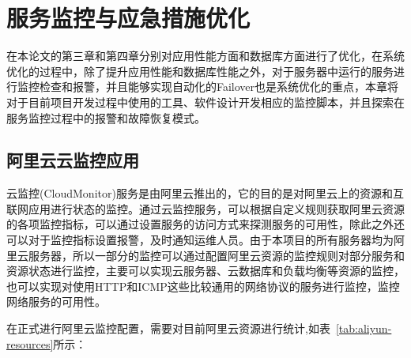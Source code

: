 \chapter{服务监控与应急措施优化}
在本论文的第三章和第四章分别对应用性能方面和数据库方面进行了优化，在系统优化的过程中，除了提升应用性能和数据库性能之外，对于服务器中运行的服务进行监控检查和报警，并且能够实现自动化的Failover也是系统优化的重点，本章将对于目前项目开发过程中使用的工具、软件设计开发相应的监控脚本，并且探索在服务监控过程中的报警和故障恢复模式\cite{刘雄辉2007服务器监控管理}。
\label{cha:Monitor}
\section{阿里云云监控应用}
云监控(CloudMonitor)服务是由阿里云推出的，它的目的是对阿里云上的资源和互联网应用进行状态的监控。通过云监控服务，可以根据自定义规则获取阿里云资源的各项监控指标，可以通过设置服务的访问方式来探测服务的可用性，除此之外还可以对于监控指标设置报警，及时通知运维人员。由于本项目的所有服务器均为阿里云服务器，所以一部分的监控可以通过配置阿里云资源的监控规则对部分服务和资源状态进行监控，主要可以实现云服务器、云数据库和负载均衡等资源的监控，也可以实现对使用HTTP和ICMP这些比较通用的网络协议的服务进行监控，监控网络服务的可用性\cite{梁宇2014基于}。

在正式进行阿里云监控配置，需要对目前阿里云资源进行统计,如表~\ref{tab:aliyun-resources}所示：

